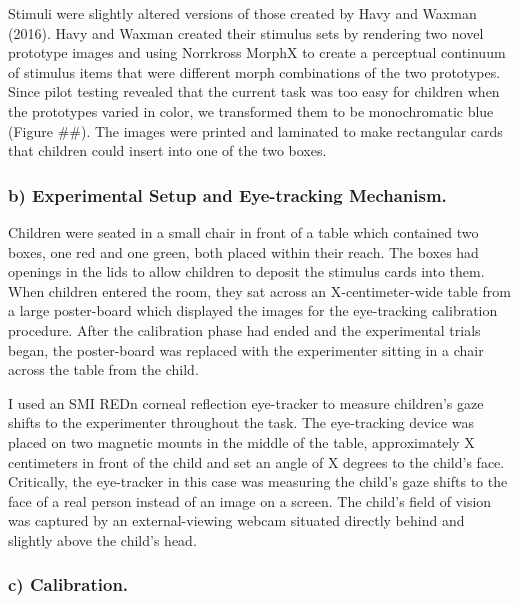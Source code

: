 \documentclass[man]{apa6}
\theoremstyle{definition}
\theoremstyle{definition}
\theoremstyle{definition}
\theoremstyle{remark}
\begin{document}
Stimuli were slightly altered versions of those created by Havy and
Waxman (2016). Havy and Waxman created their stimulus sets by rendering
two novel prototype images and using Norrkross MorphX to create a
perceptual continuum of stimulus items that were different morph
combinations of the two prototypes. Since pilot testing revealed that
the current task was too easy for children when the prototypes varied in
color, we transformed them to be monochromatic blue (Figure \#\#). The
images were printed and laminated to make rectangular cards that
children could insert into one of the two boxes.

\subsubsection{b) Experimental Setup and Eye-tracking
Mechanism.}\label{b-experimental-setup-and-eye-tracking-mechanism.}

Children were seated in a small chair in front of a table which
contained two boxes, one red and one green, both placed within their
reach. The boxes had openings in the lids to allow children to deposit
the stimulus cards into them. When children entered the room, they sat
across an X-centimeter-wide table from a large poster-board which
displayed the images for the eye-tracking calibration procedure. After
the calibration phase had ended and the experimental trials began, the
poster-board was replaced with the experimenter sitting in a chair
across the table from the child.

I used an SMI REDn corneal reflection eye-tracker to measure children's
gaze shifts to the experimenter throughout the task. The eye-tracking
device was placed on two magnetic mounts in the middle of the table,
approximately X centimeters in front of the child and set an angle of X
degrees to the child's face. Critically, the eye-tracker in this case
was measuring the child's gaze shifts to the face of a real person
instead of an image on a screen. The child's field of vision was
captured by an external-viewing webcam situated directly behind and
slightly above the child's head.

\subsubsection{c) Calibration.}\label{c-calibration.}
\end{document}
